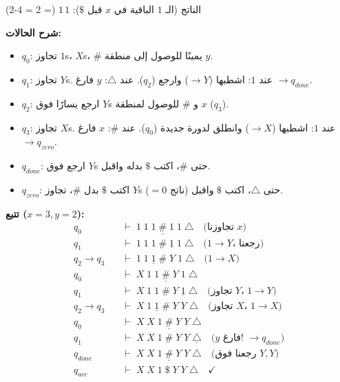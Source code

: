 \documentclass[14pt]{extarticle}
\begin{document}
الناتج (الـ $1$ الباقية في $x$ قبل $\$$): $1\,1$ (= 2 = 4-2) \checkmark

\medskip
\textbf{شرح الحالات:}
\begin{itemize}
    \item $q_0$: تجاوز $1$s، $X$s، $\#$ يمينًا للوصول إلى منطقة $y$.
    \item $q_1$: تجاوز $Y$s. عند $1$: اشطبها ($\to Y$) وارجع ($q_2$). عند $\triangle$: $y$ فارغ $\to q_{done}$.
    \item $q_2$: ارجع يسارًا فوق $Y$s و $\#$ للوصول لمنطقة $x$ ($q_3$).
    \item $q_3$: تجاوز $X$s. عند $1$: اشطبها ($\to X$) وانطلق لدورة جديدة ($q_0$). عند $\#$: $x$ فارغ $\to q_{zero}$.
    \item $q_{done}$: ارجع فوق $Y$s حتى $\#$، اكتب $\$$ بدله واقبل.
    \item $q_{zero}$: اكتب $\$$ بدل $\#$، تجاوز $Y$s حتى $\triangle$، اكتب $\$$ واقبل (ناتج $= 0$).
\end{itemize}

\textbf{تتبع ($x=3, y=2$):}
\begin{align*}
q_0 \quad &\vdash \; 1 \; 1 \; 1 \; \underline{\#} \; 1 \; 1 \; \triangle \quad \text{(تجاوزنا $x$)} \\
q_1 \quad &\vdash \; 1 \; 1 \; 1 \; \# \; \underline{1} \; 1 \; \triangle \quad \text{($1 \to Y$، رجعنا)} \\
q_2 \to q_3 \quad &\vdash \; 1 \; 1 \; \underline{1} \; \# \; Y \; 1 \; \triangle \quad \text{($1 \to X$)} \\
q_0 \quad &\vdash \; X \; 1 \; 1 \; \underline{\#} \; Y \; 1 \; \triangle \\
q_1 \quad &\vdash \; X \; 1 \; 1 \; \# \; Y \; \underline{1} \; \triangle \quad \text{(تجاوز $Y$، $1 \to Y$)} \\
q_2 \to q_3 \quad &\vdash \; X \; 1 \; \underline{1} \; \# \; Y \; Y \; \triangle \quad \text{(تجاوز $X$، $1 \to X$)} \\
q_0 \quad &\vdash \; X \; X \; 1 \; \underline{\#} \; Y \; Y \; \triangle \\
q_1 \quad &\vdash \; X \; X \; 1 \; \# \; Y \; Y \; \underline{\triangle} \quad \text{($y$ فارغ! $\to q_{done}$)} \\
q_{done} \quad &\vdash \; X \; X \; 1 \; \underline{\#} \; Y \; Y \; \triangle \quad \text{(رجعنا فوق $Y,Y$)} \\
q_{acc} \quad &\vdash \; X \; X \; 1 \; \$ \; Y \; Y \; \triangle \quad \checkmark
\end{align*}
\end{document}
